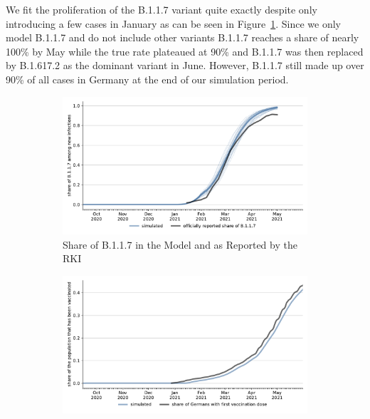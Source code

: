 \FloatBarrier

We fit the proliferation of the B.1.1.7 variant quite exactly despite only introducing a
few cases in January as can be seen in Figure~\ref{fig:fit_share_b117}. Since we only
model B.1.1.7 and do not include other variants B.1.1.7 reaches a share of nearly 100\%
by May while the true rate plateaued at 90\% and B.1.1.7 was then replaced by B.1.617.2
as the dominant variant in June. However, B.1.1.7 still made up over 90\% of all cases in
Germany at the end of our simulation period.

\begin{figure}[ht]
  \centering

  \begin{subfigure}[b]{0.425\textwidth}   %
    \centering
    \includegraphics[width=\textwidth]{figures/results/figures/scenario_comparisons/combined_fit/full_share_b117_with_single_runs}
    \caption{Share of B.1.1.7 in the Model and as Reported by the RKI}
    \label{fig:fit_share_b117}
  \end{subfigure}
  \hfill
  \begin{subfigure}[b]{0.425\textwidth}    %
    \centering
    \includegraphics[width=\textwidth]{figures/results/figures/scenario_comparisons/combined_fit/full_ever_vaccinated}

\end{subfigure}
\end{figure}
